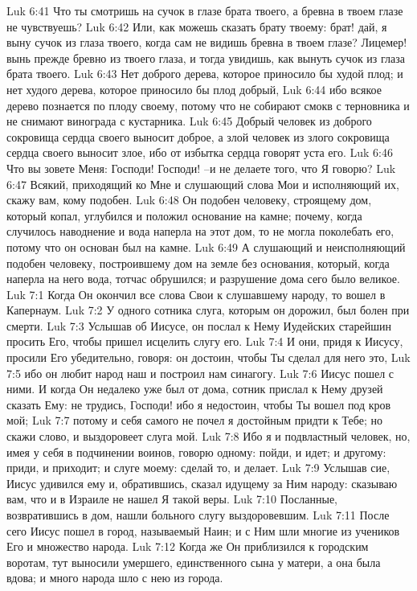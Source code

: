 Luk 6:41  Что ты смотришь на сучок в глазе брата твоего, а бревна в твоем глазе не чувствуешь?
Luk 6:42  Или, как можешь сказать брату твоему: брат! дай, я выну сучок из глаза твоего, когда сам не видишь бревна в твоем глазе? Лицемер! вынь прежде бревно из твоего глаза, и тогда увидишь, как вынуть сучок из глаза брата твоего.
Luk 6:43  Нет доброго дерева, которое приносило бы худой плод; и нет худого дерева, которое приносило бы плод добрый,
Luk 6:44  ибо всякое дерево познается по плоду своему, потому что не собирают смокв с терновника и не снимают винограда с кустарника.
Luk 6:45  Добрый человек из доброго сокровища сердца своего выносит доброе, а злой человек из злого сокровища сердца своего выносит злое, ибо от избытка сердца говорят уста его.
Luk 6:46  Что вы зовете Меня: Господи! Господи! --и не делаете того, что Я говорю?
Luk 6:47  Всякий, приходящий ко Мне и слушающий слова Мои и исполняющий их, скажу вам, кому подобен.
Luk 6:48  Он подобен человеку, строящему дом, который копал, углубился и положил основание на камне; почему, когда случилось наводнение и вода наперла на этот дом, то не могла поколебать его, потому что он основан был на камне.
Luk 6:49  А слушающий и неисполняющий подобен человеку, построившему дом на земле без основания, который, когда наперла на него вода, тотчас обрушился; и разрушение дома сего было великое.
Luk 7:1  Когда Он окончил все слова Свои к слушавшему народу, то вошел в Капернаум.
Luk 7:2  У одного сотника слуга, которым он дорожил, был болен при смерти.
Luk 7:3  Услышав об Иисусе, он послал к Нему Иудейских старейшин просить Его, чтобы пришел исцелить слугу его.
Luk 7:4  И они, придя к Иисусу, просили Его убедительно, говоря: он достоин, чтобы Ты сделал для него это,
Luk 7:5  ибо он любит народ наш и построил нам синагогу.
Luk 7:6  Иисус пошел с ними. И когда Он недалеко уже был от дома, сотник прислал к Нему друзей сказать Ему: не трудись, Господи! ибо я недостоин, чтобы Ты вошел под кров мой;
Luk 7:7  потому и себя самого не почел я достойным придти к Тебе; но скажи слово, и выздоровеет слуга мой.
Luk 7:8  Ибо я и подвластный человек, но, имея у себя в подчинении воинов, говорю одному: пойди, и идет; и другому: приди, и приходит; и слуге моему: сделай то, и делает.
Luk 7:9  Услышав сие, Иисус удивился ему и, обратившись, сказал идущему за Ним народу: сказываю вам, что и в Израиле не нашел Я такой веры.
Luk 7:10  Посланные, возвратившись в дом, нашли больного слугу выздоровевшим.
Luk 7:11  После сего Иисус пошел в город, называемый Наин; и с Ним шли многие из учеников Его и множество народа.
Luk 7:12  Когда же Он приблизился к городским воротам, тут выносили умершего, единственного сына у матери, а она была вдова; и много народа шло с нею из города.
